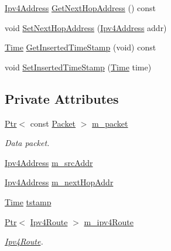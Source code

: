 \begin{DoxyCompactItemize}
\item 
\hyperlink{classns3_1_1Ipv4Address}{Ipv4\+Address} \hyperlink{classns3_1_1dsr_1_1DsrNetworkQueueEntry_ad59514cb30505eae059f114d465bc065}{Get\+Next\+Hop\+Address} () const 
\item 
void \hyperlink{classns3_1_1dsr_1_1DsrNetworkQueueEntry_a5deaf45cb27196d00fbb2b9227d45c03}{Set\+Next\+Hop\+Address} (\hyperlink{classns3_1_1Ipv4Address}{Ipv4\+Address} addr)
\item 
\hyperlink{classns3_1_1Time}{Time} \hyperlink{classns3_1_1dsr_1_1DsrNetworkQueueEntry_a87f68b9c1965ed354922334c42553a55}{Get\+Inserted\+Time\+Stamp} (void) const 
\item 
void \hyperlink{classns3_1_1dsr_1_1DsrNetworkQueueEntry_a9f6784e8f83250f596f999fd503d68a8}{Set\+Inserted\+Time\+Stamp} (\hyperlink{classns3_1_1Time}{Time} time)
\end{DoxyCompactItemize}
\subsection*{Private Attributes}
\begin{DoxyCompactItemize}
\item 
\hyperlink{classns3_1_1Ptr}{Ptr}$<$ const \hyperlink{classns3_1_1Packet}{Packet} $>$ \hyperlink{classns3_1_1dsr_1_1DsrNetworkQueueEntry_afc60a937094280a0b79ae68e2b6cd5e0}{m\+\_\+packet}
\begin{DoxyCompactList}\small\item\em Data packet. \end{DoxyCompactList}\item 
\hyperlink{classns3_1_1Ipv4Address}{Ipv4\+Address} \hyperlink{classns3_1_1dsr_1_1DsrNetworkQueueEntry_a2f9fcd2bc10258822b5404b7cb68dae1}{m\+\_\+src\+Addr}
\item 
\hyperlink{classns3_1_1Ipv4Address}{Ipv4\+Address} \hyperlink{classns3_1_1dsr_1_1DsrNetworkQueueEntry_ab9ac4a98aee9b1f77b1998227bab6806}{m\+\_\+next\+Hop\+Addr}
\item 
\hyperlink{classns3_1_1Time}{Time} \hyperlink{classns3_1_1dsr_1_1DsrNetworkQueueEntry_afd3a4e2dfc3922f590ad1fdf6b3a12c9}{tstamp}
\item 
\hyperlink{classns3_1_1Ptr}{Ptr}$<$ \hyperlink{classns3_1_1Ipv4Route}{Ipv4\+Route} $>$ \hyperlink{classns3_1_1dsr_1_1DsrNetworkQueueEntry_a12cda7d6c4932967b286645d82c822bc}{m\+\_\+ipv4\+Route}
\begin{DoxyCompactList}\small\item\em \hyperlink{classns3_1_1Ipv4Route}{Ipv4\+Route}. \end{DoxyCompactList}\end{DoxyCompactItemize}


